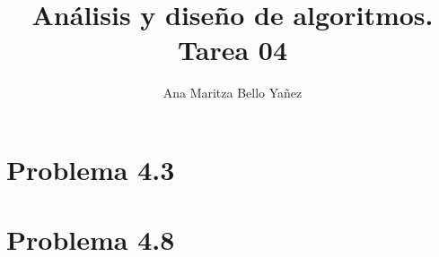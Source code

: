 \documentclass{article}
\begin{document}
\title{Análisis y diseño de algoritmos. \\ Tarea 04}
\author{Ana Maritza Bello Yañez}
\maketitle

\section*{Problema 4.3}
% 
% 

\section*{Problema 4.8}
\end{document}
